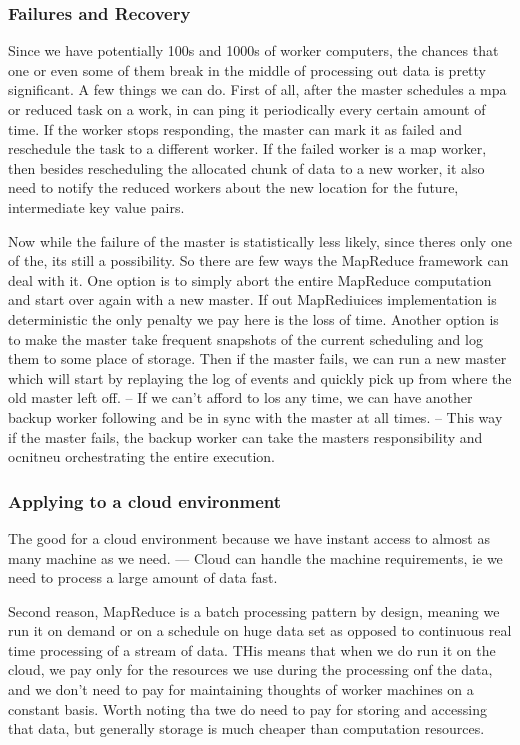 \documentclass[a4paper, 11pt]{book}
\begin{document}
    \subsubsection{Failures and Recovery}
    Since we have potentially 100s and 1000s of worker computers, the chances that one or even some of them break in the middle of processing out data is pretty significant.
    A few things we can do.
    First of all, after the master schedules a mpa or reduced task on a work, in can ping it periodically every certain amount of time.
    If the worker stops responding, the master can mark it as failed and reschedule the task to a different worker.
    If the failed worker is a map worker, then besides rescheduling the allocated chunk of data to a new worker, it also need to notify the reduced workers about the new location for the future, intermediate key value pairs.

    Now while the failure of the master is statistically less likely, since theres only one of the, its still a possibility.
    So there are few ways the MapReduce framework can deal with it.
    One option is to simply abort the entire MapReduce computation and start over again with a new master.
    If out MapRediuices implementation is deterministic the only penalty we pay here is the loss of time.
    Another option is to make the master take frequent snapshots of the current scheduling and log them to some place of storage.
    Then if the master fails, we can run a new master which will start by replaying the log of events and quickly pick up from where the old master left off.
    -- If we can't afford to los any time, we can have another backup worker following and be in sync with the master at all times.
    -- This way if the master fails, the backup worker can take the masters responsibility and ocnitneu orchestrating the entire execution.

    \subsubsection{Applying to a cloud environment}
    The good for a cloud environment because we have instant access to almost as many machine as we need.
    --- Cloud can handle the machine requirements, ie we need to process a large amount of data fast.

    Second reason, MapReduce is a batch processing pattern by design, meaning we run it on demand or on a schedule on huge data set as opposed to continuous real time processing of a stream of data.
    THis means that when we do run it on the cloud, we pay only for the resources we use during the processing onf the data, and we don't need to pay for maintaining thoughts of worker machines on a constant basis.
    Worth noting tha twe do need to pay for storing and accessing that data, but generally storage is much cheaper than computation resources.
\end{document}
